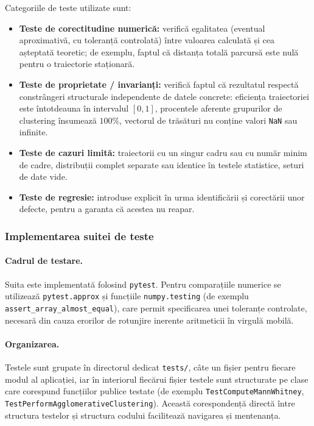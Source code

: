 \documentclass[12pt,a4paper]{report}
\theoremstyle{definition}
\theoremstyle{remark}
\begin{document}
Categoriile de teste utilizate sunt:

\begin{itemize}
  \item \textbf{Teste de corectitudine numerică:} verifică egalitatea
        (eventual aproximativă, cu toleranță controlată) între valoarea
        calculată și cea așteptată teoretic; de exemplu, faptul că distanța
        totală parcursă este nulă pentru o traiectorie staționară.
  \item \textbf{Teste de proprietate / invarianți:} verifică faptul că
        rezultatul respectă constrângeri structurale independente de datele
        concrete: eficiența traiectoriei este întotdeauna în intervalul
        $[0,1]$, procentele aferente grupurilor de clustering însumează
        $100\%$, vectorul de trăsături nu conține valori \texttt{NaN} sau
        infinite.
  \item \textbf{Teste de cazuri limită:} traiectorii cu un
        singur cadru sau cu număr minim de cadre, distribuții complet
        separate sau identice în testele statistice, seturi de date vide.
  \item \textbf{Teste de regresie:} introduse explicit în urma identificării
        și corectării unor defecte, pentru a garanta că acestea nu reapar.
\end{itemize}

\subsubsection{Implementarea suitei de teste}

\paragraph{Cadrul de testare.} Suita este implementată folosind
\texttt{pytest}. Pentru comparațiile numerice se utilizează
\texttt{pytest.approx} și funcțiile \texttt{numpy.testing} (de exemplu
\texttt{assert\_array\_almost\_equal}), care permit specificarea unei toleranțe
controlate, necesară din cauza erorilor de rotunjire inerente aritmeticii în
virgulă mobilă.

\paragraph{Organizarea.} Testele sunt grupate în directorul dedicat
\texttt{tests/}, câte un fișier pentru fiecare modul al aplicației, iar în
interiorul fiecărui fișier testele sunt structurate pe clase care corespund
funcțiilor publice testate (de exemplu \texttt{TestComputeMannWhitney},
\texttt{TestPerformAgglomerativeClustering}). Această corespondență directă
între structura testelor și structura codului facilitează navigarea și
mentenanța.
\end{document}
